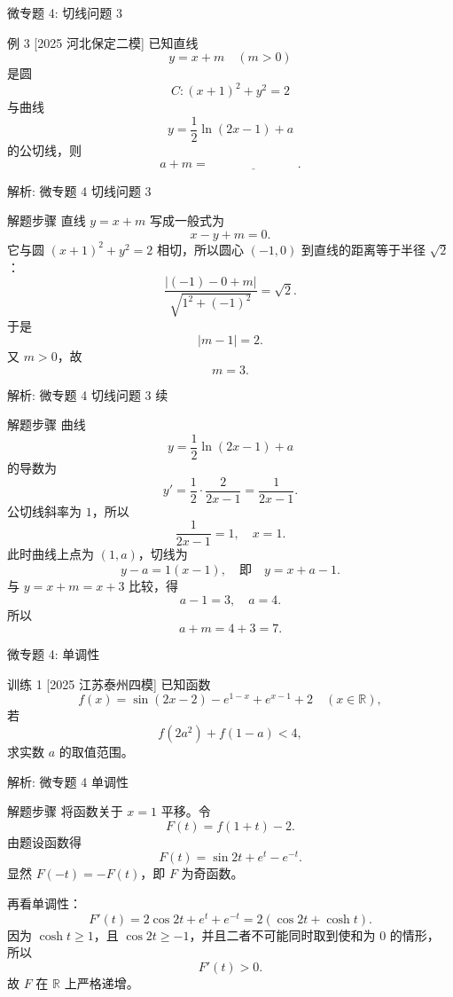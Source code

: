 ﻿\documentclass[aspectratio=169,10pt]{ctexbeamer}
\begin{document}
\begin{frame}[t]{微专题 4: 切线问题 3}
\large
\begin{block}{例 3}
[2025 河北保定二模] 已知直线
\[
y=x+m\quad (m>0)
\]
是圆
\[
C:(x+1)^2+y^2=2
\]
与曲线
\[
y=\frac12\ln(2x-1)+a
\]
的公切线，则
\[
a+m=\underline{\hspace{3cm}}.
\]
\end{block}
\end{frame}

\begin{frame}[t,allowframebreaks]{解析: 微专题 4 切线问题 3}
\tiny
\begin{block}{解题步骤}
直线 $y=x+m$ 写成一般式为
\[
x-y+m=0.
\]
它与圆 $(x+1)^2+y^2=2$ 相切，所以圆心 $(-1,0)$ 到直线的距离等于半径 $\sqrt2$：
\[
\frac{|(-1)-0+m|}{\sqrt{1^2+(-1)^2}}=\sqrt2.
\]
于是
\[
|m-1|=2.
\]
又 $m>0$，故
\[
m=3.
\]
\end{block}
\end{frame}

\begin{frame}[t,allowframebreaks]{解析: 微专题 4 切线问题 3 续}
\tiny
\begin{block}{解题步骤}
曲线
\[
y=\frac12\ln(2x-1)+a
\]
的导数为
\[
y'=\frac12\cdot\frac2{2x-1}=\frac1{2x-1}.
\]
公切线斜率为 $1$，所以
\[
\frac1{2x-1}=1,\quad x=1.
\]
此时曲线上点为 $(1,a)$，切线为
\[
y-a=1(x-1),\quad 即\quad y=x+a-1.
\]
与 $y=x+m=x+3$ 比较，得
\[
a-1=3,\quad a=4.
\]
所以
\[
a+m=4+3=7.
\]
\end{block}
\end{frame}

\begin{frame}[t]{微专题 4: 单调性}
\large
\begin{block}{训练 1}
[2025 江苏泰州四模] 已知函数
\[
f(x)=\sin(2x-2)-e^{1-x}+e^{x-1}+2\quad (x\in\mathbb{R}),
\]
若
\[
f(2a^2)+f(1-a)<4,
\]
求实数 $a$ 的取值范围。
\end{block}
\end{frame}

\begin{frame}[t,allowframebreaks]{解析: 微专题 4 单调性}
\tiny
\begin{block}{解题步骤}
将函数关于 $x=1$ 平移。令
\[
F(t)=f(1+t)-2.
\]
由题设函数得
\[
F(t)=\sin 2t+e^t-e^{-t}.
\]
显然 $F(-t)=-F(t)$，即 $F$ 为奇函数。

再看单调性：
\[
F'(t)=2\cos2t+e^t+e^{-t}=2(\cos2t+\cosh t).
\]
因为 $\cosh t\ge1$，且 $\cos2t\ge-1$，并且二者不可能同时取到使和为 $0$ 的情形，
所以
\[
F'(t)>0.
\]
故 $F$ 在 $\mathbb R$ 上严格递增。
\end{block}
\end{frame}
\end{document}
